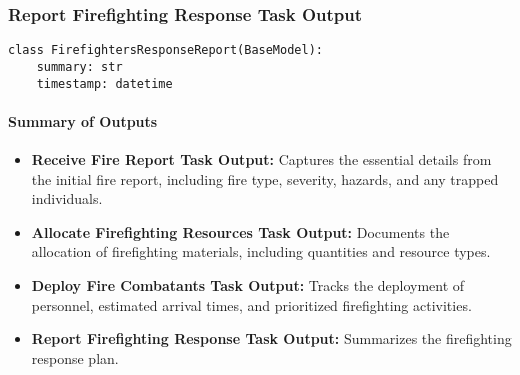 \subsubsection{Report Firefighting Response Task Output}
\begin{lstlisting}[caption={Pydantic model for Report Firefighting Response Task Output}]
class FirefightersResponseReport(BaseModel):
    summary: str
    timestamp: datetime
\end{lstlisting}

\paragraph{Summary of Outputs}
\begin{itemize}
\item \textbf{Receive Fire Report Task Output:} Captures the essential details from the initial fire report, including fire type, severity, hazards, and any trapped individuals.
\item \textbf{Allocate Firefighting Resources Task Output:} Documents the allocation of firefighting materials, including quantities and resource types.
\item \textbf{Deploy Fire Combatants Task Output:} Tracks the deployment of personnel, estimated arrival times, and prioritized firefighting activities.
\item \textbf{Report Firefighting Response Task Output:} Summarizes the firefighting response plan.
\end{itemize}


